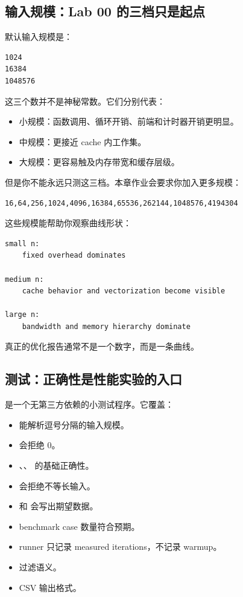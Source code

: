 \subsection{输入规模：Lab 00 的三档只是起点}

默认输入规模是：

\begin{lstlisting}
1024
16384
1048576
\end{lstlisting}

这三个数并不是神秘常数。它们分别代表：

\begin{itemize}
  \item 小规模：函数调用、循环开销、前端和计时器开销更明显。
  \item 中规模：更接近 cache 内工作集。
  \item 大规模：更容易触及内存带宽和缓存层级。
\end{itemize}

但是你不能永远只测这三档。本章作业会要求你加入更多规模：

\begin{lstlisting}
16,64,256,1024,4096,16384,65536,262144,1048576,4194304
\end{lstlisting}

这些规模能帮助你观察曲线形状：

\begin{lstlisting}
small n:
    fixed overhead dominates

medium n:
    cache behavior and vectorization become visible

large n:
    bandwidth and memory hierarchy dominate
\end{lstlisting}

真正的优化报告通常不是一个数字，而是一条曲线。

\subsection{测试：正确性是性能实验的入口}

 是一个无第三方依赖的小测试程序。它覆盖：

\begin{itemize}
  \item {} 能解析逗号分隔的输入规模。
  \item {} 会拒绝 0。
  \item {}、、 的基础正确性。
  \item {} 会拒绝不等长输入。
  \item {} 和  会写出期望数据。
  \item benchmark case 数量符合预期。
  \item runner 只记录 measured iterations，不记录 warmup。
  \item {} 过滤语义。
  \item CSV 输出格式。
\end{itemize}

